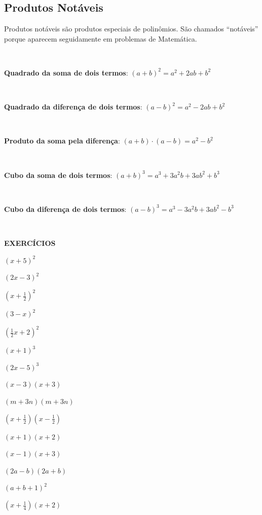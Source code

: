 \subsection{Produtos Notáveis}

Produtos notáveis são produtos especiais de polinômios. São chamados “notáveis” porque aparecem seguidamente em problemas de Matemática.

~~



\textbf{Quadrado da soma de dois termos}: $(a+b)^2 = a^2 + 2ab + b^2$

~~

\textbf{Quadrado da diferença de dois termos}: $(a - b)^2 = a^2 - 2ab + b^2$

~~

\textbf{Produto da soma pela diferença}: $(a + b) \cdot (a - b) = a^2 - b^2$

~~

\textbf{Cubo da soma de dois termos}: $(a + b)^3 = a^3 + 3a^2b + 3ab^2 + b^3$

~~

\textbf{Cubo da diferença de dois termos}: $(a - b)^3 = a^3 - 3a^2b + 3ab^2 - b^3$

~~

\noindent\textbf{EXERCÍCIOS \thesubsection}

\begin{enumerate}[label=\alph*)]
\begin{multicols}{3}
    \item $(x+5)^2$
    
    \item $(2x-3)^2$
    
    \item $(x+\frac{1}{2})^2$
    
    \item $(3-x)^2$
    
    \item $(\frac{1}{2}x+2)^2$
    
    \item $(x+1)^3$
    
    \item $(2x-5)^3$
    
    \item $(x-3)(x+3)$
    
    \item $(m+3n)(m+3n)$
    
    \item $(x+\frac{1}{2})(x-\frac{1}{2})$
    
    \item $(x+1)(x+2)$
    
    \item $(x-1)(x+3)$
    
    \item $(2a-b)(2a+b)$
    
    \item $(a+b+1)^2$
    
    \item $(x+\frac{1}{4})(x+2)$
\end{multicols}
\end{enumerate}

